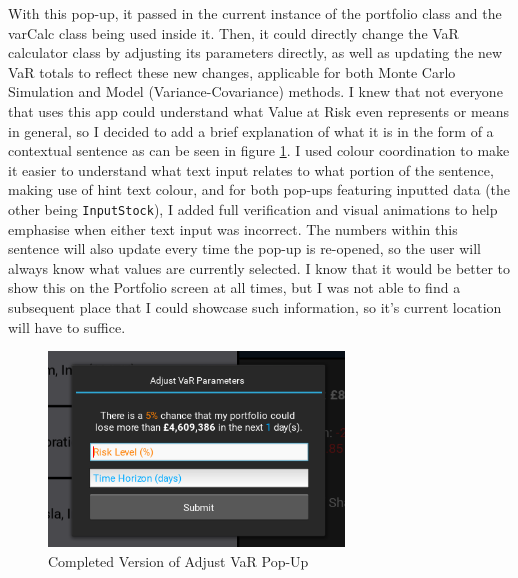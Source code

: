 \documentclass{article}
\begin{document}
\vspace{0.3cm}
With this pop-up, it passed in the current instance of the portfolio class and the varCalc class being used inside it. Then, it could directly change the VaR calculator class by adjusting its parameters directly, as well as updating the new VaR totals to reflect these new changes, applicable for both Monte Carlo Simulation and Model (Variance-Covariance) methods. I knew that not everyone that uses this app could understand what Value at Risk even represents or means in general, so I decided to add a brief explanation of what it is in the form of a contextual sentence as can be seen in figure \ref{fig:Final Adjust VaR}. I used colour coordination to make it easier to understand what text input relates to what portion of the sentence, making use of hint text colour, and for both pop-ups featuring inputted data (the other being \texttt{InputStock}), I added full verification and visual animations to help emphasise when either text input was incorrect. The numbers within this sentence will also update every time the pop-up is re-opened, so the user will always know what values are currently selected. I know that it would be better to show this on the Portfolio screen at all times, but I was not able to find a subsequent place that I could showcase such information, so it's current location will have to suffice.\\\vspace{0.3cm}

\begin{figure}[h]
  \centering
  \includegraphics[width=0.7\textwidth]{Images/Term 2 Images/Final Adjust VaR.png}
  \caption{Completed Version of Adjust VaR Pop-Up}
  \label{fig:Final Adjust VaR}
\end{figure}
\end{document}
